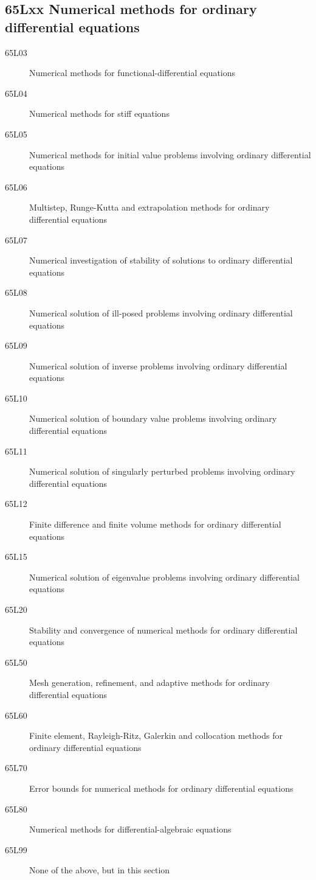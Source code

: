 \subsection*{65Lxx Numerical methods for ordinary differential equations }\label{65Lxx}
\begin{description}  
\item [65L03]\label{65L03} Numerical methods for functional-differential equations
\item [65L04]\label{65L04} Numerical methods for stiff equations
\item [65L05]\label{65L05} Numerical methods for initial value problems involving ordinary differential equations
\item [65L06]\label{65L06} Multistep, Runge-Kutta and extrapolation methods for ordinary differential equations
\item [65L07]\label{65L07} Numerical investigation of stability of solutions to ordinary differential equations
\item [65L08]\label{65L08} Numerical solution of ill-posed problems involving ordinary differential equations
\item [65L09]\label{65L09} Numerical solution of inverse problems involving ordinary differential equations
\item [65L10]\label{65L10} Numerical solution of boundary value problems involving ordinary differential equations
\item [65L11]\label{65L11} Numerical solution of singularly perturbed problems involving ordinary differential equations
\item [65L12]\label{65L12} Finite difference and finite volume methods for ordinary differential equations
\item [65L15]\label{65L15} Numerical solution of eigenvalue problems involving ordinary differential equations
\item [65L20]\label{65L20} Stability and convergence of numerical methods for ordinary differential equations
\item [65L50]\label{65L50} Mesh generation, refinement, and adaptive methods for ordinary differential equations
\item [65L60]\label{65L60} Finite element, Rayleigh-Ritz, Galerkin and collocation methods for ordinary differential equations
\item [65L70]\label{65L70} Error bounds for numerical methods for ordinary differential equations
\item [65L80]\label{65L80} Numerical methods for differential-algebraic equations
\item [65L99]\label{65L99} None of the above, but in this section
\end{description}
